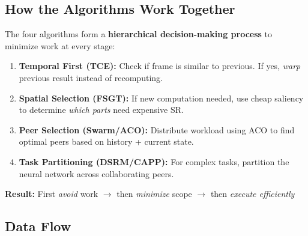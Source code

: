 \documentclass[11pt, a4paper]{article}
\begin{document}
\subsection{How the Algorithms Work Together}

\begin{quickref}
The four algorithms form a \textbf{hierarchical decision-making process} to minimize work at every stage:

\begin{enumerate}[label=\textcolor{primaryblue}{\bfseries\arabic*.}, leftmargin=*]
    \item \textbf{Temporal First (TCE):} Check if frame is similar to previous. If yes, \textit{warp} previous result instead of recomputing.

    \item \textbf{Spatial Selection (FSGT):} If new computation needed, use cheap saliency to determine \textit{which parts} need expensive SR.

    \item \textbf{Peer Selection (Swarm/ACO):} Distribute workload using ACO to find optimal peers based on history + current state.

    \item \textbf{Task Partitioning (DSRM/CAPP):} For complex tasks, partition the neural network across collaborating peers.
\end{enumerate}

\vspace{0.3cm}
\textbf{Result:} First \textit{avoid} work $\rightarrow$ then \textit{minimize} scope $\rightarrow$ then \textit{execute efficiently}
\end{quickref}

\subsection{Data Flow}
\end{document}
